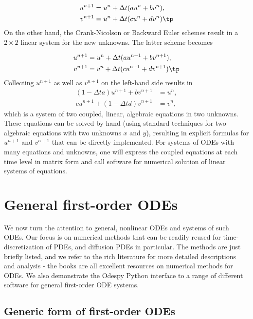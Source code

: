 \documentclass[graybox,sectrefs,envcountresetchap,open=right,final]{svmonodo}
\begin{document}
\begin{align}
u^{n+1} &= u^n + \Delta t (a u^n + b v^n),\\ 
v^{n+1} &= u^n + \Delta t (cu^n + dv^n)
\tp
\end{align}
On the other hand, the Crank-Nicolson or Backward Euler schemes result in a
$2\times 2$ linear system for the new unknowns. The latter scheme becomes

\begin{align}
u^{n+1} &= u^n + \Delta t (a u^{n+1} + b v^{n+1}),\\ 
v^{n+1} &= v^n + \Delta t (c u^{n+1} + d v^{n+1})\tp
\end{align}
Collecting $u^{n+1}$ as well as $v^{n+1}$ on the left-hand side results
in
\begin{align}
(1 - \Delta t a)u^{n+1} + bv^{n+1} &= u^n ,\\ 
c u^{n+1} + (1 - \Delta t d) v^{n+1} &= v^n ,
\end{align}
which is a system of two coupled, linear, algebraic equations in two
unknowns. These equations can be solved by hand (using standard
techniques for two algebraic equations with two unknowns $x$ and $y$),
resulting in explicit formulas for $u^{n+1}$ and $v^{n+1}$ that can be
directly implemented. For systems of ODEs with many equations and unknowns, one
will express the coupled equations at each time level in matrix form
and call software for numerical solution of linear systems of equations.


\section{General first-order ODEs}

We now turn the attention to general, nonlinear ODEs and systems of
such ODEs.  Our focus is on numerical methods that can be readily
reused for time-discretization of PDEs, and diffusion PDEs in particular.
The methods are just briefly listed, and we refer to the rich literature
for more detailed descriptions and analysis - the books
\cite{Petzold_Ascher_1998,Griffiths_et_al_2010,Hairer_Wanner_Norsett_bookI,Hairer_Wanner_bookII} are all excellent resources on numerical methods for ODEs.
We also demonstrate the Odespy Python interface to a range
of different software for general first-order ODE systems.

\subsection{Generic form of first-order ODEs}
\end{document}
